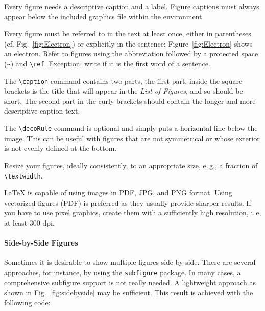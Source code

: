 Every figure needs a descriptive caption and a label. Figure captions must always appear below the included graphics file within the  environment.

Every figure must be referred to in the text at least once, either in parentheses (cf. Fig.~\ref{fig:Electron}) or explicitly in the sentence: Figure~\ref{fig:Electron} shows an electron. Refer to figures using the abbreviation  followed by a protected space (\verb|~|) and \verb|\ref|. Exception: write  if it is the first word of a sentence.

The \verb|\caption| command contains two parts,%
the first part, inside the square brackets is the title that will appear in the \emph{List of Figures}, and so should be short.
 The second part in the curly brackets should contain the longer and more descriptive caption text.

The \verb|\decoRule| command is optional and simply puts a horizontal line below the image. This can be useful with figures that are not symmetrical or whose exterior is not evenly defined at the bottom.

Resize your figures, ideally consistently, to an appropriate size, e.\,g., a fraction of \texttt{\textbackslash textwidth}.

LaTeX is capable of using images in PDF, JPG, and PNG format. Using vectorized figures (PDF) is preferred as they usually provide sharper results. If you have to use pixel graphics, create them with a sufficiently high resolution, i.\,e, at least 300 dpi.

\paragraph{Side-by-Side Figures} Sometimes it is desirable to show multiple figures side-by-side. There are several approaches, for instance, by using the \texttt{subfigure} package. In many cases, a comprehensive subfigure support is not really needed. A lightweight approach as shown in Fig.~\ref{fig:sidebyside} may be sufficient. This result is achieved with the following code:

